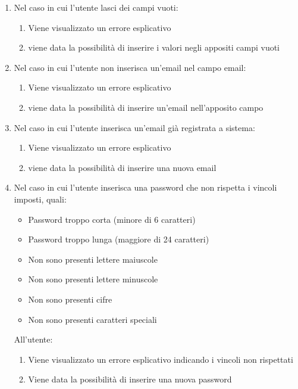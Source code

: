 \begin{enumerate}
    \item Nel caso in cui l'utente lasci dei campi vuoti: 
    \begin{enumerate}
        \item Viene visualizzato un errore esplicativo
        \item viene data la possibilità di inserire i valori negli appositi campi vuoti
    \end{enumerate}
    \item Nel caso in cui l'utente non inserisca un'email nel campo email:
    \begin{enumerate}
        \item Viene visualizzato un errore esplicativo
        \item viene data la possibilità di inserire un'email nell'apposito campo
    \end{enumerate}
    \item Nel caso in cui l'utente inserisca un'email già registrata a sistema:
    \begin{enumerate}
        \item Viene visualizzato un errore esplicativo
        \item viene data la possibilità di inserire una nuova email
    \end{enumerate}
    \item Nel caso in cui l'utente inserisca una password che non rispetta i vincoli imposti, quali:
    \begin{itemize}
        \item Password troppo corta (minore di 6 caratteri)
        \item Password troppo lunga (maggiore di 24 caratteri)
        \item Non sono presenti lettere maiuscole
        \item Non sono presenti lettere minuscole
        \item Non sono presenti cifre
        \item Non sono presenti caratteri speciali
    \end{itemize}
    All'utente:
    \begin{enumerate}
        \item Viene visualizzato un errore esplicativo indicando i vincoli non rispettati
        \item Viene data la possibilità di inserire una nuova password
    \end{enumerate}
\end{enumerate}
\newpage